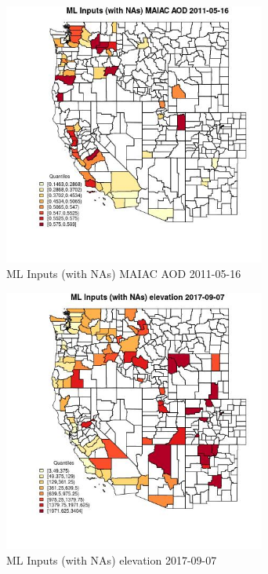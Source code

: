 \begin{figure} 
\centering  
\includegraphics[width=0.77\textwidth]{Code_Outputs/Report_ML_input_PM25_Step4_part_e_de_duplicated_aveswNAs_CountyMAIAC_AODMean2011-05-16_2011-05-16.jpg} 
\caption{\label{fig:Report_ML_input_PM25_Step4_part_e_de_duplicated_aveswNAsCountyMAIAC_AODMean2011-05-16_2011-05-16}ML Inputs (with NAs) MAIAC AOD 2011-05-16} 
\end{figure} 
 

\begin{figure} 
\centering  
\includegraphics[width=0.77\textwidth]{Code_Outputs/Report_ML_input_PM25_Step4_part_e_de_duplicated_aveswNAs_CountyelevationMean2017-09-07_2017-09-07.jpg} 
\caption{\label{fig:Report_ML_input_PM25_Step4_part_e_de_duplicated_aveswNAsCountyelevationMean2017-09-07_2017-09-07}ML Inputs (with NAs) elevation 2017-09-07} 
\end{figure} 
 


